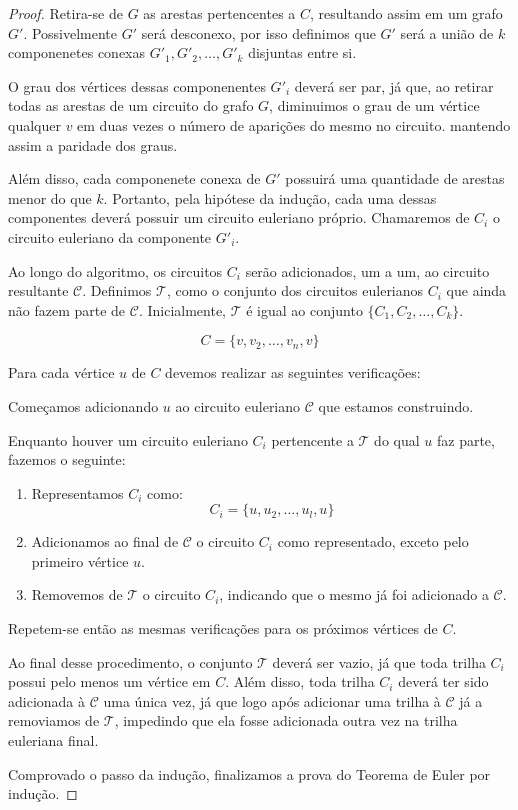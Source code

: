 \documentclass[12pt, a4paper]{article}
\begin{document}
\begin{proof}
Retira-se de $G$ as arestas pertencentes a $C$, resultando assim em um grafo $G'$. 
Possivelmente $G'$ será desconexo, por isso definimos que $G'$ será a união de $k$ componenetes conexas $G'_1, G'_2, \dots, G'_k$ disjuntas entre si.

O grau dos vértices dessas componenentes $G'_i$ deverá ser par, já que, ao retirar todas as arestas de um circuito do grafo $G$, diminuimos o grau de um vértice qualquer $v$ em duas vezes o número de aparições do mesmo no circuito. mantendo assim a paridade dos graus. 

Além disso, cada componenete conexa de $G'$ possuirá uma quantidade de arestas menor do que $k$.
Portanto, pela hipótese da indução, cada uma dessas componentes deverá possuir um circuito euleriano próprio. 
Chamaremos de $C_i$ o circuito euleriano da componente $G'_i$.

Ao longo do algoritmo, os circuitos $C_i$ serão adicionados, um a um, ao circuito resultante $\mathcal{C}$. 
Definimos $\mathcal{T}$, como o conjunto dos circuitos eulerianos $C_i$ que ainda não fazem parte de $\mathcal{C}$. 
Inicialmente, $\mathcal{T}$ é igual ao conjunto $\{C_1, C_2, \dots, C_k\}$.


\[
	C = \{v, v_2, \dots, v_n, v\}
\]

Para cada vértice $u$ de $C$ devemos realizar as seguintes verificações:

\begin{tcolorbox}

Começamos adicionando $u$ ao circuito euleriano $\mathcal{C}$ que estamos construindo.

Enquanto houver um circuito euleriano $C_i$ pertencente a $\mathcal{T}$ do qual $u$ faz parte, fazemos o seguinte:


\begin{enumerate}
    \item Representamos $C_i$ como: 
    \[
        C_i = \{u, u_2, \dots, u_l, u\}
    \]

\item Adicionamos ao final de $\mathcal{C}$ o circuito $C_i$ como representado, exceto pelo primeiro vértice $u$. 

\item Removemos de $\mathcal{T}$ o circuito $C_i$, indicando que o mesmo já foi adicionado a $\mathcal{C}$.

\end{enumerate}

Repetem-se então as mesmas verificações para os próximos vértices de $C$.
\end{tcolorbox}


Ao final desse procedimento, o conjunto $\mathcal{T}$ deverá ser vazio, já que toda trilha $C_i$ possui pelo menos um vértice em $C$. Além disso, toda trilha $C_i$ deverá ter sido adicionada à $\mathcal{C}$ uma única vez, já que logo após adicionar uma trilha à $\mathcal{C}$ já a removiamos de $\mathcal{T}$, impedindo que ela fosse adicionada outra vez na trilha euleriana final.

Comprovado o passo da indução, finalizamos a prova do Teorema de Euler por indução.

\end{proof}
\end{document}

